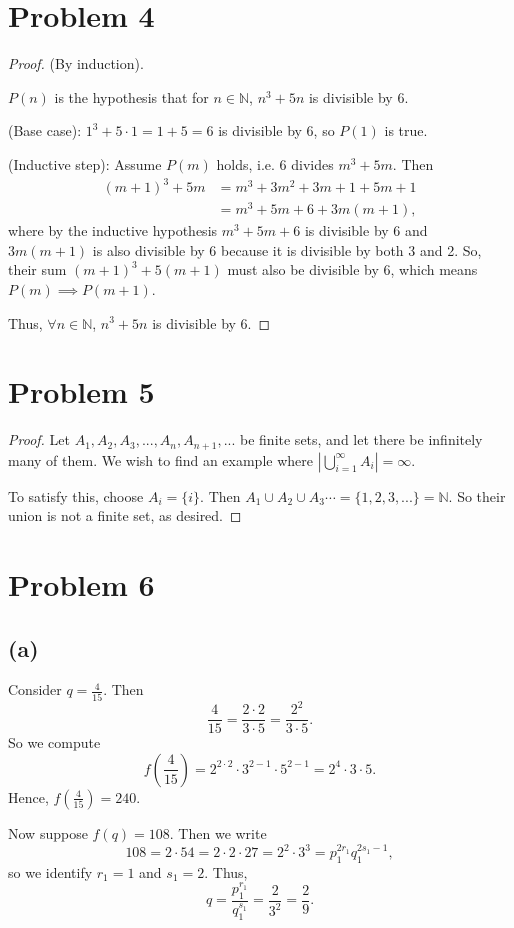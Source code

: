 \documentclass{article}
\begin{document}
\section*{Problem 4}
\begin{proof}
	(By induction). 
	
	$P(n)$ is the hypothesis that for $n\in\mathbb{N}$, $n^3 + 5n$ is divisible by $6$.
	
	(Base case): $1^3 + 5\cdot1 = 1 + 5 = 6$ is divisible by 6, so $P(1)$ is true. 
	
	(Inductive step): Assume $P(m)$ holds, i.e. 6 divides $m^3 + 5m$. Then
	\begin{align}
		(m+1)^3 + 5m &= m^3 + 3m^2 + 3m + 1 + 5m + 1 \\
		&= m^3 + 5m + 6 + 3m(m+1), 
	\end{align}
	where by the inductive hypothesis $m^3 +5m + 6$ is divisible by 6 and $3m(m+1)$ is also divisible by 6 because it is divisible by both 3 and 2. So, their sum $(m+1)^3 + 5(m+1)$ must also be divisible by 6, which means $P(m)\implies P(m+1)$.
	
	Thus, $\forall n\in\mathbb{N}$, $n^3 + 5n$ is divisible by 6. 
\end{proof}

\section*{Problem 5}
\begin{proof}
	Let $A_1, A_2, A_3, ..., A_n, A_{n+1}, ...$ be finite sets, and let there be infinitely many of them. We wish to find an example where $|\bigcup\limits_{i=1}^{\infty} A_i| = \infty$. 
	
	To satisfy this, choose $A_{i} = \{i\}$. Then $A_1 \cup A_2 \cup A_3 \cdots = \{1, 2, 3, ... \} = \mathbb{N}$. So their union is not a finite set, as desired. 
\end{proof}

\section*{Problem 6}
\subsection*{(a)}
Consider $q=\frac{4}{15}$. Then 
\begin{equation}
	\frac{4}{15} = \frac{2\cdot2}{3\cdot5} = \frac{2^2}{3\cdot5}.
\end{equation}
So we compute
\begin{equation}
	f(\frac{4}{15}) = 2^{2\cdot2} \cdot 3^{2-1}\cdot5^{2-1} = 2^4\cdot3\cdot5.
\end{equation}
Hence, $f(\frac{4}{15})=240$.

Now suppose $f(q) = 108.$ Then we write
\begin{equation}
	108 = 2\cdot54 = 2\cdot2\cdot27 = 2^2 \cdot 3^3 = p_1^{2r_1}q_1^{2s_1 - 1},
\end{equation}
so we identify $r_1 = 1$ and $s_1=2$. Thus, 
\begin{equation}
	q = \frac{p_1^{r_1}}{q_1^{s_1}} = \frac{2}{3^2} = \frac{2}{9}.
\end{equation}
\end{document}
